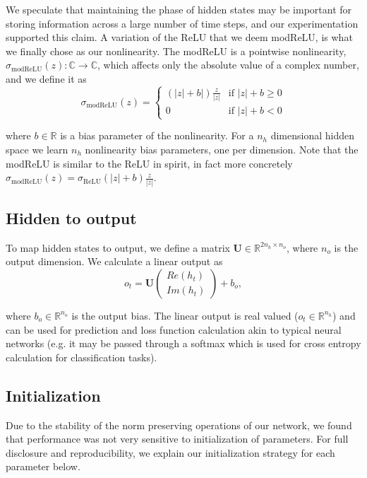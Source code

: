 \documentclass{article} %
\newcommand{\matr}[1]{\mathbf{#1}}
\newcommand\RR{\mathbb{R}}
\newcommand\CC{\mathbb{C}}
\begin{document}
We speculate that maintaining the phase of hidden states may be important for storing information 
across a large number of time steps, and our experimentation supported this claim.
A variation of the ReLU that we deem modReLU, is what we 
finally chose as our nonlinearity. The modReLU is a pointwise nonlinearity,  
$\sigma_\mathrm{modReLU} (z) : \CC \rightarrow \CC$, which
affects only the absolute value of a complex number, and we define it as 
\begin{equation} \sigma_\mathrm{modReLU} (z) = 
\left\{
  \begin{array}{ll}
    (|z|+b|) \frac{z}{|z|}  & \mbox{if } |z| + b \geq 0 \\
    0 & \mbox{if } |z| + b < 0
  \end{array}
\right.
\end{equation}

where $b \in \RR$ is a bias parameter of the nonlinearity. For a $n_h$ dimensional hidden space
we learn $n_h$ nonlinearity bias parameters, one per dimension. 
Note that the modReLU is similar to the ReLU in spirit, in fact more concretely
$\sigma_\mathrm{modReLU}(z) = \sigma_\mathrm{ReLU}(|z| + b) \frac{z}{|z|}$. 

\subsection{Hidden to output}

To map hidden states to output, we define a matrix $\matr{U} \in \RR^{2n_h \times n_o}$, 
where $n_o$ is the output dimension. We calculate a linear output as
\begin{equation} o_t = \matr{U} \begin{pmatrix} Re(h_t) \\ Im(h_t) \end{pmatrix} + b_o , \end{equation}

where $b_o \in \RR^{n_o}$ is the output bias. 
The linear output is real valued ($o_t \in \RR^{n_h}$) and can be used for prediction and loss function 
calculation akin to typical neural networks (e.g. it may be passed through a softmax which is used for 
cross entropy calculation for classification tasks).


\subsection{Initialization}

Due to the stability of the norm preserving operations of our network, we found that performance was
not very sensitive to initialization of parameters.
For full disclosure and reproducibility, we explain our initialization strategy for each parameter below.
\end{document}
